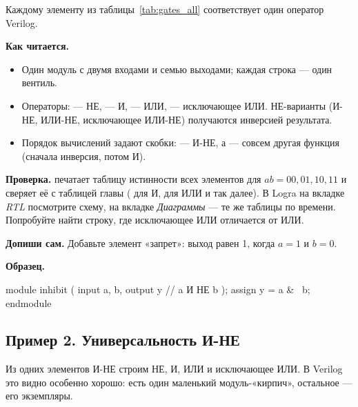 Каждому элементу из таблицы~\ref{tab:gates_all} соответствует один оператор
Verilog.


\textbf{Как читается.}
\begin{itemize}
  \item Один модуль с двумя входами и семью выходами; каждая строка  --- один вентиль.
  \item Операторы: \code{\textasciitilde} --- НЕ, \code{\&} --- И, \code{|} --- ИЛИ, \code{\^{}} --- исключающее ИЛИ. НЕ-варианты (И-НЕ, ИЛИ-НЕ, исключающее ИЛИ-НЕ) получаются инверсией результата.
  \item Порядок вычислений задают скобки:  --- И-НЕ, а  --- совсем другая функция (сначала инверсия, потом И).
\end{itemize}
\textbf{Проверка.}  печатает таблицу истинности всех
элементов для $ab=00,01,10,11$ и сверяет её с таблицей главы
( для И,  для ИЛИ и так далее). В Logra на вкладке
\emph{RTL} посмотрите схему, на вкладке \emph{Диаграммы} --- те же
таблицы по времени. Попробуйте найти строку, где исключающее ИЛИ отличается от ИЛИ.

\textbf{Допиши сам.} Добавьте элемент «запрет»: выход равен 1, когда $a=1$ и
$b=0$.

\textbf{Образец.}\par\nopagebreak
\begin{vcode}
module inhibit (
    input  a, b,
    output y          // a И НЕ b
);
    assign y = a & ~b;
endmodule
\end{vcode}

\subsection{Пример 2. Универсальность И-НЕ}

Из одних элементов И-НЕ строим НЕ, И, ИЛИ и исключающее ИЛИ. В Verilog это
видно особенно хорошо: есть один маленький модуль-«кирпич», остальное --- его
экземпляры.


